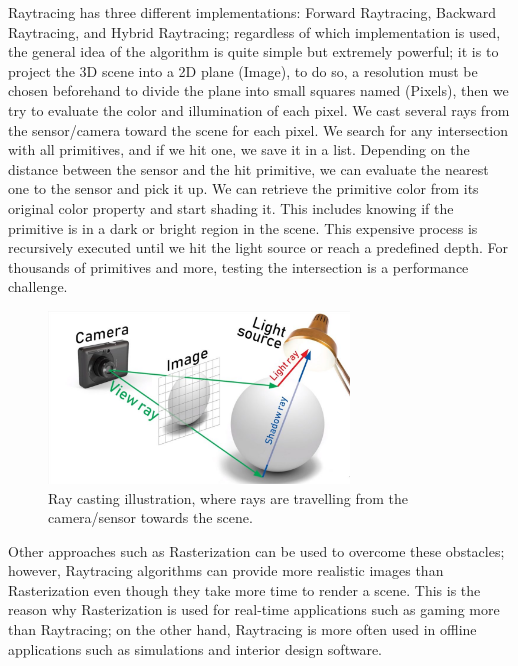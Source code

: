 \documentclass[11pt,a4paper]{article}
\begin{document}
Raytracing has three different implementations: Forward Raytracing, Backward Raytracing, and Hybrid Raytracing; regardless of which implementation is used, the general idea of the algorithm is quite simple but extremely powerful; it is to project the 3D scene into a 2D plane (Image), to do so, a resolution must be chosen beforehand to divide the plane into small squares named (Pixels), then we try to evaluate the color and illumination of each pixel. We cast several rays from the sensor/camera toward the scene for each pixel. We search for any intersection with all primitives, and if we hit one, we save it in a list. Depending on the distance between the sensor and the hit primitive, we can evaluate the nearest one to the sensor and pick it up. We can retrieve the primitive color from its original color property and start shading it. This includes knowing if the primitive is in a dark or bright region in the scene. This expensive process is recursively executed until we hit the light source or reach a predefined depth. For thousands of primitives and more, testing the intersection is a performance challenge.

\begin{figure}[h]	
     \centering
     \captionsetup{justification=centering,margin=2cm}
     \includegraphics[width=8cm]{images/raytracer_2.jpg}
     \caption{Ray casting illustration, where rays are travelling from the camera/sensor towards the scene. \protect\cite{Kimathi2020}}
        \label{fig:dice}
\end{figure}


Other approaches such as Rasterization can be used to overcome these obstacles; however, Raytracing algorithms can provide more realistic images than Rasterization even though they take more time to render a scene. This is the reason why  Rasterization is used for real-time applications such as gaming more than Raytracing; on the other hand, Raytracing is more often used in offline applications such as simulations and interior design software.
\clearpage
\end{document}
